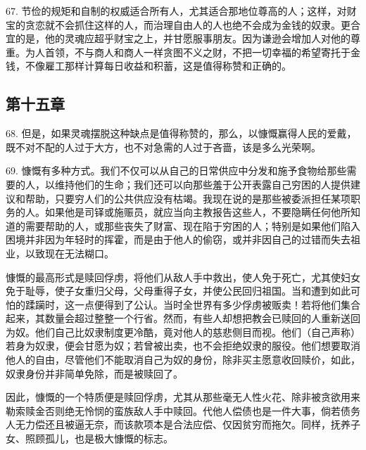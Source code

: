 67. 节俭的规矩和自制的权威适合所有人，尤其适合那地位尊高的人；这样，对财宝的贪恋就不会抓住这样的人，而治理自由人的人也绝不会成为金钱的奴隶。更合宜的是，他的灵魂应超乎财宝之上，并甘愿服事朋友。因为谦逊会增加人对他的尊重。为人首领，不与商人和商人一样贪图不义之财，不把一切幸福的希望寄托于金钱，不像雇工那样计算每日收益和积蓄，这是值得称赞和正确的。\par


\subsection{第十五章}

\par

68. 但是，如果灵魂摆脱这种缺点是值得称赞的，那么，以慷慨赢得人民的爱戴，既不对不配的人过于大方，也不对急需的人过于吝啬，该是多么光荣啊。\par

69. 慷慨有多种方式。我们不仅可以从自己的日常供应中分发和施予食物给那些需要的人，以维持他们的生命；我们还可以向那些羞于公开表露自己穷困的人提供建议和帮助，只要穷人们的公共供应没有枯竭。我现在说的是那些被委派担任某项职务的人。如果他是司铎或施赈员，就应当向主教报告这些人，不要隐瞒任何他所知道的需要帮助的人，或那些丧失了财富、现在陷于穷困的人；特别是如果他们陷入困境并非因为年轻时的挥霍，而是由于他人的偷窃，或并非因自己的过错而失去祖业，以致现在无法糊口。\par

慷慨的最高形式是赎回俘虏，将他们从敌人手中救出，使人免于死亡，尤其使妇女免于耻辱，使子女重归父母，父母重得子女，并使公民回归祖国。当和遭到如此可怕的蹂躏时，这一点便得到了公认。当时全世界有多少俘虏被贩卖！若将他们集合起来，其数量会超过整整一个行省。然而，有些人却想把教会已赎回的人重新送回为奴。他们自己比奴隶制度更冷酷，竟对他人的慈悲侧目而视。他们（自己声称）若身为奴隶，便会甘愿为奴；若曾被出卖，也不会拒绝奴隶的服役。他们想要取消他人的自由，尽管他们不能取消自己为奴的身份，除非买主愿意收回赎价，如此，奴隶身份并非简单免除，而是被赎回了。\par

因此，慷慨的一个特质便是赎回俘虏，尤其从那些毫无人性火花、除非被贪欲用来勒索赎金否则绝无怜悯的蛮族敌人手中赎回。代他人偿债也是一件大事，倘若债务人无力偿还且被逼无奈，而该款项本是合法应偿、仅因贫穷而拖欠。同样，抚养子女、照顾孤儿，也是极大慷慨的标志。\par

